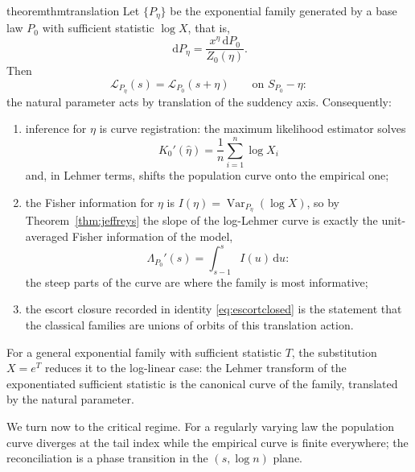 \documentclass[sn-mathphys-num]{sn-jnl}
\theoremstyle{thmstyleone}%
\theoremstyle{thmstyletwo}%
\theoremstyle{thmstylethree}%
\theoremstyle{thmstyleone}%
\providecommand{\Var}{\operatorname{Var}}
\providecommand{\Leh}{\mathscr{L}}
\providecommand{\dd}{\,\mathrm{d}}
\begin{document}
	\begin{restatable}{theorem}{thmtranslation}\label{thm:translation}
		Let $\{P_\eta\}$ be the exponential family generated by a base law
		$P_0$ with sufficient statistic $\log X$, that is,
		\begin{equation}\label{eq:expfam}
			\dd P_\eta=\frac{x^{\eta}\dd P_0}{Z_0(\eta)} .
		\end{equation}
		Then
		\begin{equation}\label{eq:translation}
			\Leh_{P_\eta}(s)=\Leh_{P_0}(s+\eta)
			\qquad\text{on }S_{P_0}-\eta :
		\end{equation}
		the natural parameter acts by translation of the suddency axis.
		Consequently:
		\begin{enumerate}[label=\textup{(\roman*)},leftmargin=2.2em]
			\item inference for $\eta$ is curve registration: the maximum
			likelihood estimator solves
			\begin{equation}\label{eq:mle}
				K_0'(\widehat\eta)=\frac1n\sum_{i=1}^n\log X_i
			\end{equation}
			and, in Lehmer terms, shifts the population curve onto the
			empirical one;
			\item the Fisher information for $\eta$ is
			$I(\eta)=\Var_{P_\eta}(\log X)$, so by
			Theorem~\ref{thm:jeffreys} the slope of the log-Lehmer curve
			is exactly the unit-averaged Fisher information of the model,
			\begin{equation}\label{eq:infoslope}
				\Lambda_{P_0}'(s)=\int_{s-1}^{s}I(u)\dd u :
			\end{equation}
			the steep parts of the curve are where the family is most
			informative;
			\item the escort closure recorded in
			identity \eqref{eq:escortclosed} is the statement that the classical
			families are unions of orbits of this translation action.
		\end{enumerate}
	\end{restatable}
	
	
	For a general exponential family with sufficient statistic $T$, the
	substitution $X=e^{T}$ reduces it to the log-linear case: the Lehmer
	transform of the exponentiated sufficient statistic is the canonical
	curve of the family, translated by the natural parameter.
	
	We turn now to the critical regime. For a regularly varying law the
	population curve diverges at the tail index while the empirical
	curve is finite everywhere; the reconciliation is a phase transition
	in the $(s,\log n)$ plane.
	
\end{document}
